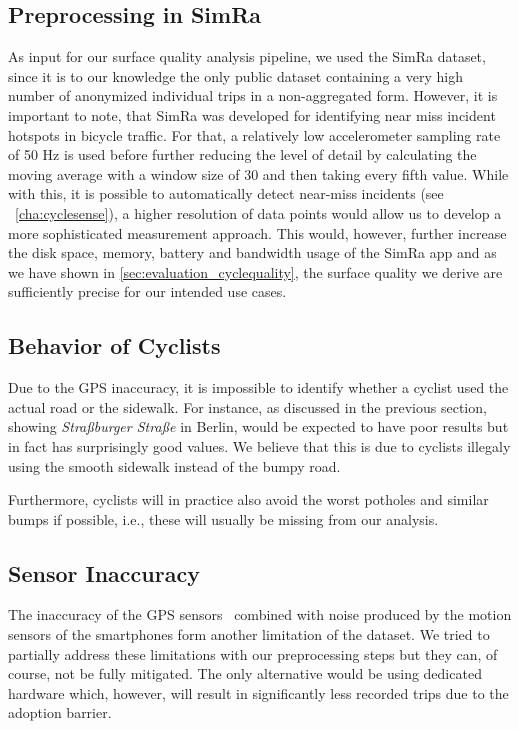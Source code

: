 \subsection{Preprocessing in SimRa}
\label{sec:problem_simra}
As input for our surface quality analysis pipeline, we used the SimRa dataset, since it is to our knowledge the only public dataset containing a very high number of anonymized individual trips in a non-aggregated form.
However, it is important to note, that SimRa was developed for identifying near miss incident hotspots in bicycle traffic.
For that, a relatively low accelerometer sampling rate of 50 Hz is used before further reducing the level of detail by calculating the moving average with a window size of 30 and then taking every fifth value.
While with this, it is possible to automatically detect near-miss incidents (see ~\cref{cha:cyclesense}), a higher resolution of data points would allow us to develop a more sophisticated measurement approach.
This would, however, further increase the disk space, memory, battery and bandwidth usage of the SimRa app and as we have shown in \cref{sec:evaluation_cyclequality}, the surface quality we derive are sufficiently precise for our intended use cases.

\subsection{Behavior of Cyclists}
\label{subsec:behavior_of_cyclists}
Due to the GPS inaccuracy, it is impossible to identify whether a cyclist used the actual road or the sidewalk.
For instance, as discussed in the previous section,  showing \textit{Straßburger Straße} in Berlin, would be expected to have poor results but in fact has surprisingly good values.
We believe that this is due to cyclists illegaly using the smooth sidewalk instead of the bumpy road.

Furthermore, cyclists will in practice also avoid the worst potholes and similar bumps if possible, i.e., these will usually be missing from our analysis.

\subsection{Sensor Inaccuracy}
\label{subsec:sensor_inaccuracy}
The inaccuracy of the GPS sensors~\cite{merry2019smartphone} combined with noise produced by the motion sensors of the smartphones form another limitation of the dataset.
We tried to partially address these limitations with our preprocessing steps but they can, of course, not be fully mitigated.
The only alternative would be using dedicated hardware which, however, will result in significantly less recorded trips due to the adoption barrier.

